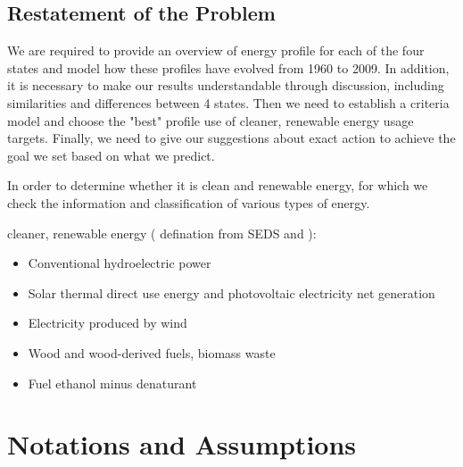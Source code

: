 \documentclass{mcmthesis}
\begin{document}
    \subsection{Restatement of the Problem}
    We are required to provide an overview of energy profile for each of the four states and model how these profiles have evolved from 1960 to 2009. In addition, it is necessary to make our results understandable through discussion, including similarities and differences between 4 states. Then we need to establish a criteria model and choose the "best" profile use of cleaner, renewable energy usage targets. Finally, we need to give our suggestions about exact action to achieve the goal we set based on what we predict.

    In order to determine whether it is clean and renewable energy, for which we check the information and classification of various types of energy.

    \noindent
    cleaner, renewable energy ( defination from SEDS and ):
    \begin{itemize}
      \item Conventional hydroelectric power
      \item Solar thermal direct use energy and photovoltaic electricity net generation
      \item Electricity produced by wind
      \item Wood and wood-derived fuels, biomass waste
      \item Fuel ethanol minus denaturant
    \end{itemize}

\section{Notations and Assumptions}
\end{document}
